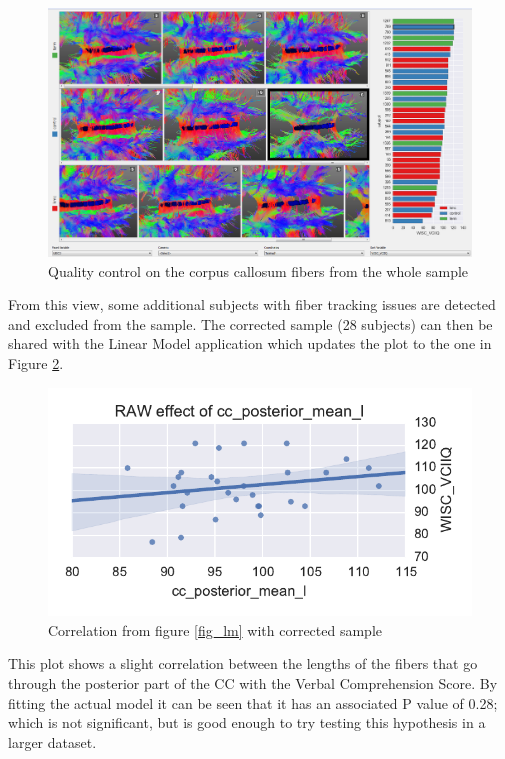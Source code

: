 \documentclass[twocolumn]{svjour3}
\begin{document}
\begin{figure}
\begin{center}
\includegraphics[width=\linewidth]{figures/cases/quality_control_trim}
\end{center}
 \caption{\label{fig_sample} Quality control on the corpus callosum fibers from the whole sample}
\end{figure}

From this view, some additional subjects with fiber tracking issues are detected and excluded from the sample. The corrected sample (28 subjects) can then be shared with the Linear Model application which updates the plot to the one in Figure \ref{fig_lm2}.


\begin{figure}
\begin{center}
\includegraphics[width=\linewidth]{figures/cases/final_corr}
\end{center}
 \caption{\label{fig_lm2} Correlation from figure \ref{fig_lm} with corrected sample}
\end{figure}


This plot shows a slight correlation between the lengths of the fibers that go through the posterior part of the CC with the Verbal Comprehension Score. By fitting the actual model it can be seen that it has an associated P value of 0.28; which is not significant, but is good enough to try testing this hypothesis in a larger dataset.
  
\end{document}
